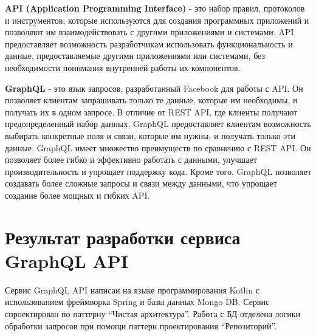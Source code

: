 \textbf{API (Application Programming Interface)} - это набор правил, протоколов и инструментов, 
которые используются для создания программных приложений и позволяют им взаимодействовать с другими приложениями и системами. 
API предоставляет возможность разработчикам использовать функциональность и данные, 
предоставляемые другими приложениями или системами, 
без необходимости понимания внутренней работы их компонентов.

\textbf{GraphQL} - это язык запросов, разработанный Facebook для работы с API. 
Он позволяет клиентам запрашивать только те данные, которые им необходимы, и получать их в одном запросе. 
В отличие от REST API, где клиенты получают предопределенный набор данных, 
GraphQL предоставляет клиентам возможность выбирать конкретные поля и связи, 
которые им нужны, и получать только эти данные.
GraphQL имеет множество преимуществ по сравнению с REST API. 
Он позволяет более гибко и эффективно работать с данными, 
улучшает производительность и упрощает поддержку кода. Кроме того, 
GraphQL позволяет создавать более сложные запросы и связи между данными, 
что упрощает создание более мощных и гибких API.

\section{Результат разработки сервиса GraphQL API}

Сервис GraphQL API написан на языке программирования Kotlin с использованием фреймворка Spring и базы данных Mongo DB.
Сервис спроектирован по паттерну “Чистая архитектура”.
Работа с БД отделена логики обработки запросов при помощи паттерн проектирования “Репозиторий”.  

